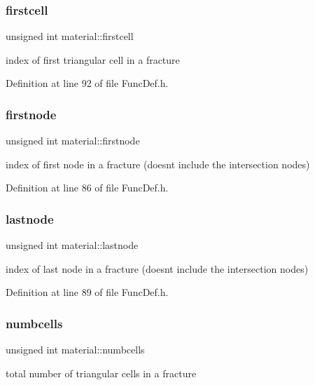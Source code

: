 \subsubsection{\texorpdfstring{firstcell}{firstcell}}
{\footnotesize\ttfamily unsigned int material\+::firstcell}

index of first triangular cell in a fracture 

Definition at line 92 of file Func\+Def.\+h.

\mbox{\label{structmaterial_a82946cb78555ad8c4c14a12fbd7aa3f8}} 
\subsubsection{\texorpdfstring{firstnode}{firstnode}}
{\footnotesize\ttfamily unsigned int material\+::firstnode}

index of first node in a fracture (doesn\textquotesingle{}t include the intersection nodes) 

Definition at line 86 of file Func\+Def.\+h.

\mbox{\label{structmaterial_a9bbfaca53483df79578f4ae037867851}} 
\subsubsection{\texorpdfstring{lastnode}{lastnode}}
{\footnotesize\ttfamily unsigned int material\+::lastnode}

index of last node in a fracture (doesn\textquotesingle{}t include the intersection nodes) 

Definition at line 89 of file Func\+Def.\+h.

\mbox{\label{structmaterial_a84365556a52eb9959d6d869dda76433c}} 
\subsubsection{\texorpdfstring{numbcells}{numbcells}}
{\footnotesize\ttfamily unsigned int material\+::numbcells}

total number of triangular cells in a fracture 

